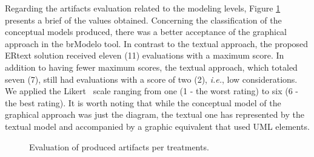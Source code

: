 Regarding the artifacts evaluation related to the modeling levels, Figure \ref{fig:ToolModelsEval}  presents a brief of the values obtained.
Concerning the classification of the conceptual models produced, there was a better acceptance of the graphical approach in the brModelo tool.
In contrast to the textual approach, the proposed ERtext solution received eleven (11) evaluations with a maximum score.
In addition to having fewer maximum scores, the textual approach, which totaled seven (7), still had evaluations with a score of two (2), \textit{i.e.}, low considerations.
We applied the Likert~\cite{Likert} scale ranging from one (1 - the worst rating) to six (6 - the best rating). It is worth noting that while the conceptual model of the graphical approach was just the diagram, the textual one has represented by the textual model and accompanied by a graphic equivalent that used UML elements.

\begin{figure}[!htb]
    \centering
    \caption{Evaluation of produced artifacts per treatments.}
    \label{fig:ToolModelsEval}
    
\end{figure}

